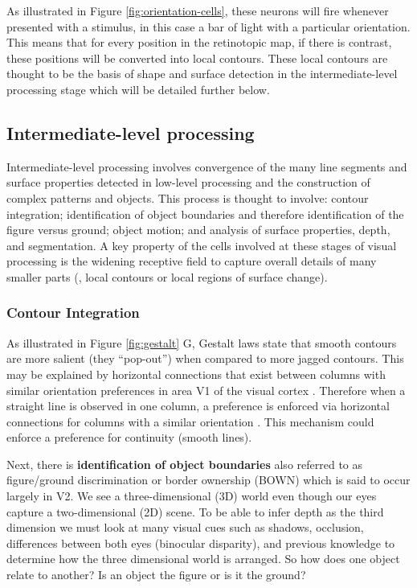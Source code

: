 As illustrated in Figure \ref{fig:orientation-cells}, these neurons will fire whenever presented with a stimulus, in this case a bar of light with a particular orientation. 
This means that for every position in the retinotopic map, if there is contrast, these positions will be converted into local contours.
These local contours are thought to be the basis of shape and surface detection in the intermediate-level processing stage which will be detailed further below.\\

\subsection{Intermediate-level processing}
Intermediate-level processing involves convergence of the many line segments and surface properties detected in low-level processing and the construction of complex patterns and objects. 
This process is thought to involve: contour integration; identification of object boundaries and therefore identification of the figure versus ground; object motion; and analysis of surface properties, depth, and segmentation. 
A key property of the cells involved at these stages of visual processing is the widening receptive field to capture overall details of many smaller parts (\eg, local contours or local regions of surface change).

\subsubsection{Contour Integration}
As illustrated in Figure \ref{fig:gestalt} G, Gestalt laws state that smooth contours are more salient (they ``pop-out'') when compared to more jagged contours.
This may be explained by horizontal connections that exist between columns with similar orientation preferences in area V1 of the visual cortex \cite{kapadia1995improvement}. 
Therefore when a straight line is observed in one column, a preference is enforced via horizontal connections for columns with a similar orientation \cite{kapadia1995improvement}.
This mechanism could enforce a preference for continuity (smooth lines). 

Next, there is \textbf{identification of object boundaries} also referred to as figure/ground discrimination \cite{lee2003computations, qiu2005figure} or border ownership (BOWN) which is said to occur largely in V2. 
We see a three-dimensional (3D) world even though our eyes capture a two-dimensional (2D) scene. 
To be able to infer depth as the third dimension we must look at many visual cues such as shadows, occlusion, differences between both eyes (binocular disparity), and previous knowledge to determine how the three dimensional world is arranged. 
So how does one object relate to another? Is an object the figure or is it the ground? 

